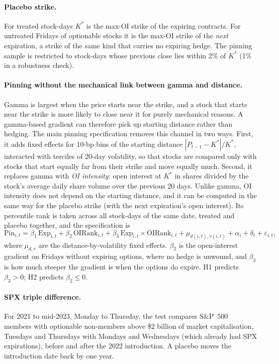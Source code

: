\documentclass[11pt,a4paper]{article}
\newcommand{\Kstar}{K^{*}}
\begin{document}
\paragraph{Placebo strike.} For treated stock-days $\Kstar$ is the max-OI strike of the expiring contracts. For untreated Fridays of optionable stocks it is the max-OI strike of the \emph{next} expiration, a strike of the same kind that carries no expiring hedge. The pinning sample is restricted to stock-days whose previous close lies within 2\% of $\Kstar$ (1\% in a robustness check).

\paragraph{Pinning without the mechanical link between gamma and distance.} Gamma is largest when the price starts near the strike, and a stock that starts near the strike is more likely to close near it for purely mechanical reasons. A gamma-based gradient can therefore pick up starting distance rather than hedging. The main pinning specification removes this channel in two ways. First, it adds fixed effects for 10-bp bins of the starting distance $|P_{t-1}-\Kstar|/\Kstar$, interacted with terciles of 20-day volatility, so that stocks are compared only with stocks that start equally far from their strike and move equally much. Second, it replaces gamma with \emph{OI intensity}: open interest at $\Kstar$ in shares divided by the stock's average daily share volume over the previous 20 days. Unlike gamma, OI intensity does not depend on the starting distance, and it can be computed in the same way for the placebo strike (with the next expiration's open interest). Its percentile rank is taken across all stock-days of the same date, treated and placebo together, and the specification is
\begin{equation}
\mathrm{Pin}_{i,t} = \beta_1\,\mathrm{Exp}_{i,t} + \beta_2\,\mathrm{OIRank}_{i,t} + \beta_3\,\mathrm{Exp}_{i,t}\times\mathrm{OIRank}_{i,t} + \mu_{d(i,t),v(i,t)} + \alpha_i + \delta_t + \varepsilon_{i,t},
\end{equation}
where $\mu_{d,v}$ are the distance-by-volatility fixed effects. $\beta_2$ is the open-interest gradient on Fridays without expiring options, where no hedge is unwound, and $\beta_3$ is how much steeper the gradient is when the options do expire. H1 predicts $\beta_3>0$; H2 predicts $\beta_2\le 0$.

\paragraph{SPX triple difference.} For 2021 to mid-2023, Monday to Thursday, the test compares S\&P~500 members with optionable non-members above \$2 billion of market capitalisation, Tuesdays and Thursdays with Mondays and Wednesdays (which already had SPX expirations), before and after the 2022 introduction. A placebo moves the introduction date back by one year.
\end{document}
